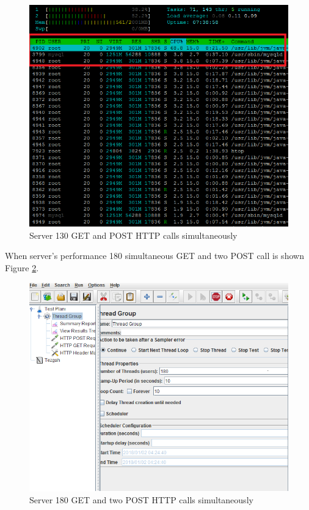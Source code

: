 \begin{figure}[!htbp]
\centering
\includegraphics[width=\textwidth]{projectChapters/images/130users2.png}
\caption{Server 130 GET and POST HTTP calls simultaneously}
\label{fig:130users}
\end{figure}

\newpage


When server's performance 180 simultaneous GET and two POST call is shown Figure
\ref{fig:180user}.

\begin{figure}[!htbp]
\centering
\includegraphics[width=\textwidth]{projectChapters/images/180users1.png}
\caption{Server 180 GET and two POST HTTP calls simultaneously}
\label{fig:180user}
\end{figure}

